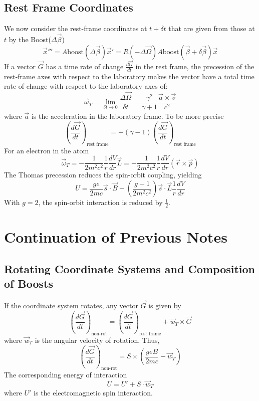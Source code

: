 \documentclass{article}
\begin{document}
	\subsection*{Rest Frame Coordinates}
	We now consider the rest-frame coordinates at $t+\delta t$ that are given from those at $t$ by the Boost($\Delta\vec{\beta}$)
	$$ \vec{x}''' = A \text{boost}(\Delta\vec{\beta}) \vec{x}' = R(-\Delta\vec{\Omega}) A \text{boost}(\vec{\beta}+\delta\vec{\beta}) \vec{x} $$
	If a vector $\vec{G}$ has a time rate of change $\frac{d\vec{G}}{dt}$ in the rest frame, the precession of the rest-frame axes with respect to the laboratory makes the vector have a total time rate of change with respect to the laboratory axes of:
	$$ \vec{\omega}_T = \lim_{\delta t \to 0} \frac{\Delta\vec{\Omega}}{\delta t} = \frac{\gamma^2}{\gamma+1} \frac{\vec{a} \times \vec{v}}{c^2} $$
	where $\vec{a}$ is the acceleration in the laboratory frame.
	To be more precise
	$$ \left( \frac{d\vec{G}}{dt} \right)_{\text{rest frame}} = + (\gamma-1) \left( \frac{d\vec{G}}{dt} \right)_{\text{rest frame}} $$
	For an electron in the atom
	$$ \vec{\omega}_T = -\frac{1}{2m^2c^2} \frac{1}{r}\frac{dV}{dr} \vec{L} = -\frac{1}{2m^2c^2} \frac{1}{r}\frac{dV}{dr} (\vec{r} \times \vec{p}) $$
	The Thomas precession reduces the spin-orbit coupling, yielding
	$$ U = \frac{ge}{2mc} \vec{s} \cdot \vec{B} + (\frac{g-1}{2m^2c^2}) \vec{s} \cdot \vec{L} \frac{1}{r} \frac{dV}{dr} $$
	With $g=2$, the spin-orbit interaction is reduced by $\frac{1}{2}$.
	\section*{Continuation of Previous Notes}
	
	\subsection*{Rotating Coordinate Systems and Composition of Boosts}
	If the coordinate system rotates, any vector $\vec{G}$ is given by
	\[
	\left( \frac{d\vec{G}}{dt} \right)_{\text{non-rot}} = \left( \frac{d\vec{G}}{dt} \right)_{\text{rest frame}} + \vec{w}_T \times \vec{G}
	\]
	where $\vec{w}_T$ is the angular velocity of rotation.
	Thus,
	\[
	\left( \frac{d\vec{G}}{dt} \right)_{\text{non-rot}} = S \times \left( \frac{g e B}{2mc} - \vec{w}_T \right)
	\]
	The corresponding energy of interaction
	\[
	U = U' + S \cdot \vec{w}_T
	\]
	where $U'$ is the electromagnetic spin interaction.
	
\end{document}
